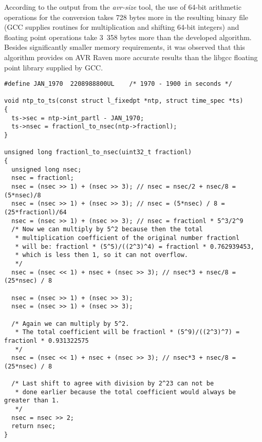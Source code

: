 According to the output from the {\it{avr-size}} tool,
the use of 64-bit arithmetic operations for the conversion
takes 728 bytes more in the
resulting binary file (GCC supplies routines for multiplication and shifting 64-bit integers)
and floating point operations take 3~358 bytes more
than the developed algorithm.
Besides significantly smaller memory requirements,
it was observed that this algorithm provides on AVR Raven
more accurate results than the libgcc floating point library supplied by GCC.
\newpage
\begin{lstlisting}[caption={Conversion from NTP timestamp to POSIX timestamp},label={lst:implementation-conversion}]
#define	JAN_1970  2208988800UL    /* 1970 - 1900 in seconds */

void ntp_to_ts(const struct l_fixedpt *ntp, struct time_spec *ts)
{
  ts->sec = ntp->int_partl - JAN_1970;
  ts->nsec = fractionl_to_nsec(ntp->fractionl);
}

unsigned long fractionl_to_nsec(uint32_t fractionl)
{
  unsigned long nsec;
  nsec = fractionl;
  nsec = (nsec >> 1) + (nsec >> 3); // nsec = nsec/2 + nsec/8 = (5*nsec)/8
  nsec = (nsec >> 1) + (nsec >> 3); // nsec = (5*nsec) / 8 = (25*fractionl)/64
  nsec = (nsec >> 1) + (nsec >> 3); // nsec = fractionl * 5^3/2^9
  /* Now we can multiply by 5^2 because then the total
   * multiplication coefficient of the original number fractionl
   * will be: fractionl * (5^5)/((2^3)^4) = fractionl * 0.762939453,
   * which is less then 1, so it can not overflow.
   */
  nsec = (nsec << 1) + nsec + (nsec >> 3); // nsec*3 + nsec/8 = (25*nsec) / 8

  nsec = (nsec >> 1) + (nsec >> 3);
  nsec = (nsec >> 1) + (nsec >> 3);

  /* Again we can multiply by 5^2.
   * The total coefficient will be fractionl * (5^9)/((2^3)^7) = fractionl * 0.931322575
   */
  nsec = (nsec << 1) + nsec + (nsec >> 3); // nsec*3 + nsec/8 = (25*nsec) / 8

  /* Last shift to agree with division by 2^23 can not be
   * done earlier because the total coefficient would always be greater than 1.
   */
  nsec = nsec >> 2;
  return nsec;
}
\end{lstlisting}

